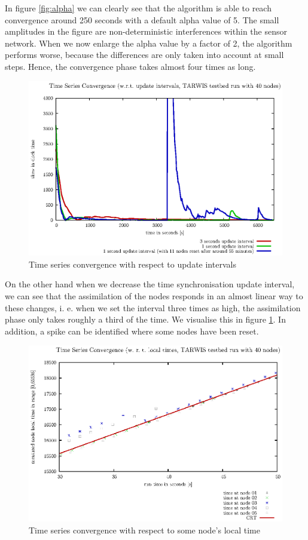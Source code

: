 \documentclass{llncs}
\begin{document}
\noindent In figure \ref{fig:alpha} we can clearly see that the algorithm is able to reach convergence around 250 seconds with a default alpha value of 5. The small amplitudes in the figure are non-deterministic interferences within the sensor network. When we now enlarge the alpha value by a factor of 2, the algorithm performs worse, because the differences are only taken into account at small steps. Hence, the convergence phase takes almost four times as long.\\
\begin{figure}[H]
	\centering
	\includegraphics[scale=0.8]{images/FIG_02.eps}
	\caption{Time series convergence with respect to update intervals}
	\label{fig:update_intervals}
\end{figure}
\noindent On the other hand when we decrease the time synchronisation update interval, we can see that the assimilation of the nodes responds in an almost linear way to these changes, i. e. when we set the interval three times as high, the assimilation phase only takes roughly a third of the time. We visualise this in figure \ref{fig:update_intervals}. In addition, a spike can be identified where some nodes have been reset.\\

\begin{figure}[H]
	\centering
	\includegraphics[scale=0.8]{images/FIG_03.eps}
	\caption{Time series convergence with respect to some node's local time}
	\label{fig:local_time}
\end{figure}
\end{document}
